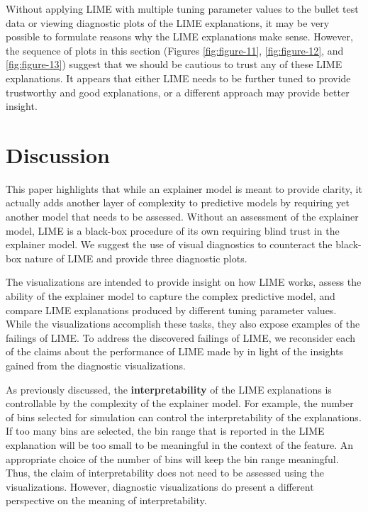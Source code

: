 \documentclass[AMS,STIX2COL]{WileyNJD-v2}\usepackage[]{graphicx}\usepackage[]{color}
\begin{document}
Without applying LIME with multiple tuning parameter values to the bullet test data or viewing diagnostic plots of the LIME explanations, it may be very possible to formulate reasons why the LIME explanations make sense. However, the sequence of plots in this section (Figures \ref{fig:figure-11}, \ref{fig:figure-12}, and \ref{fig:figure-13}) suggest that we should be cautious to trust any of these LIME explanations. It appears that either LIME needs to be further tuned to provide trustworthy and good explanations, or a different approach may provide better insight. 

\section{Discussion} \label{discussion}

This paper highlights that while an explainer model is meant to provide clarity, it actually adds another layer of complexity to predictive models by requiring yet another model that needs to be assessed. Without an assessment of the explainer model, LIME is a black-box procedure of its own requiring blind trust in the explainer model. We suggest the use of visual diagnostics to counteract the black-box nature of LIME and provide three diagnostic plots.

The visualizations are intended to provide insight on how LIME works, assess the ability of the explainer model to capture the complex predictive model, and compare LIME explanations produced by different tuning parameter values. While the visualizations accomplish these tasks, they also expose examples of the failings of LIME. To address the discovered failings of LIME, we reconsider each of the claims about the performance of LIME made by \citet{ribeiro:2016} in light of the insights gained from the diagnostic visualizations.

As previously discussed, the \textbf{interpretability} of the LIME explanations is controllable  by the complexity of the explainer model. For example, the number of bins selected for simulation can control the interpretability of the explanations. If too many bins are selected, the bin range that is reported in the LIME explanation will be too small to be meaningful in the context of the feature. An appropriate choice of the number of bins will keep the bin range meaningful. Thus, the claim of interpretability does not need to be assessed using the visualizations. However, diagnostic visualizations do present a different perspective on the meaning of interpretability.
\end{document}
